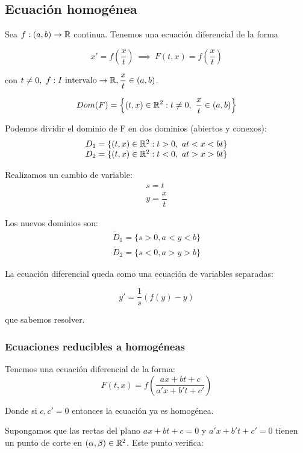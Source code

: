 \subsection{Ecuación homogénea}

Sea $f:(a,b) \to \mathbb{R}$ continua. Tenemos una ecuación diferencial de la forma

\[x' = f\left(\frac{x}{t}\right) \ \implies \ F\left(t,x\right) = f\left(\frac{x}{t}\right)\]

con $t \neq 0,\ f: I \text{ intervalo} \to \mathbb{R}, \dfrac{x}{t} \in (a,b)$.

\[Dom(F) = \left\{(t,x)\in \mathbb{R} ^2 : t \neq 0, \ \frac{x}{t} \in (a,b)\right\}\]

Podemos dividir el dominio de F en dos dominios (abiertos y conexos):\\
\[
\begin{array}{l}
  D_1 = \{(t,x) \in \mathbb{R} ^2 : t > 0, \ at < x < bt\}\\
  D_2 = \{(t,x) \in \mathbb{R} ^2 : t < 0, \ at > x > bt\}
\end{array}
\]

Realizamos un cambio de variable:
\[
\begin{array}{l}
  s = t\\
  y = \dfrac{x}{t}
\end{array}
\]

Los nuevos dominios son:
\[
\begin{array}{l}
  \tilde{D}_1 = \{s > 0, a < y < b\}\\
  \tilde{D}_2 = \{s < 0, a > y > b\}
\end{array}
\]

La ecuación diferencial queda como una ecuación de variables separadas:

$$y' = \frac{1}{s}\left(f(y) - y\right)$$

que sabemos resolver.

\subsubsection{Ecuaciones reducibles a homogéneas}

Tenemos una ecuación diferencial de la forma: 
\[
F(t,x) = f\left( \frac{ax+bt+c}{a'x+b't+c'} \right)
\]

Donde si $c,c' = 0$ entonces la ecuación ya es homogénea.

Supongamos que las rectas del plano $ax + bt+c=0$ y $a'x+b't+c'=0$ tienen un punto de corte en $(\alpha, \beta ) \in \mathbb{R}^2$. Este punto verifica:


